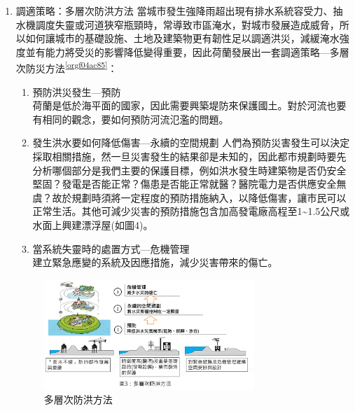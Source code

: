 \documentclass[a4paper,12pt]{article}
\begin{document}
\begin{enumerate}
\item 調適策略：多層次防洪方法
\label{sec:org85f3998}
當城市發生強降雨超出現有排水系統容受力、抽水機調度失靈或河道狹窄瓶頸時，常導致市區淹水，對城市發展造成威脅，所以如何讓城市的基礎設施、土地及建築物更有韌性足以調適洪災，減緩淹水強度並有能力將受災的影響降低變得重要，因此荷蘭發展出一套調適策略—多層次防災方法\textsuperscript{\ref{orgf04ac85}}：\\
\begin{enumerate}
\item 預防洪災發生—預防\\
荷蘭是低於海平面的國家，因此需要興築堤防來保護國土。對於河流也要有相同的觀念，要如何預防河流氾濫的問題。\\
\item 發生洪水要如何降低傷害—永續的空間規劃   人們為預防災害發生可以決定採取相關措施，然一旦災害發生的結果卻是未知的，因此都市規劃時要先分析哪個部分是我們主要的保護目標，例如洪水發生時建築物是否仍安全堅固？發電是否能正常？傷患是否能正常就醫？醫院電力是否供應安全無虞？故於規劃時須將一定程度的預防措施納入，以降低傷害，讓市民可以正常生活。其他可減少災害的預防措施包含加高發電廠高程至1\textasciitilde{}1.5公尺或水面上興建漂浮屋(如圖4)。\\
\item 當系統失靈時的處置方式—危機管理\\
建立緊急應變的系統及因應措施，減少災害帶來的傷亡。\\
\end{enumerate}

\begin{figure}[htbp]
\centering
\includegraphics[width=300]{images/hl-1.png}
\caption{\label{fig:Holand}多層次防洪方法}
\end{figure}


\end{enumerate}
\end{document}
